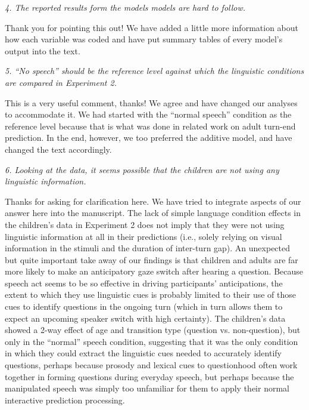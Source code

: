 \documentclass[11pt,a4paper]{letter} %
\begin{document}
\begin{letter}{}
\smallskip

\noindent \textit{4. The reported results form the models models are hard to follow.}

\noindent Thank you for pointing this out! We have added a little more information about how each variable was coded and have put summary tables of every model's output into the text.

\smallskip

\noindent \textit{5. ``No speech'' should be the reference level against which the linguistic conditions are compared in Experiment 2.}

\noindent This is a very useful comment, thanks! We agree and have changed our analyses to accommodate it. We had started with the ``normal speech'' condition as the reference level because that is what was done in related work on adult turn-end prediction. In the end, however, we too preferred the additive model, and have changed the text accordingly.

\noindent \textit{6. Looking at the data, it seems possible that the children are not using any linguistic information.}

\noindent Thanks for asking for clarification here. We have tried to integrate aspects of our answer here into the manuscript. The lack of simple language condition effects in the children's data in Experiment 2 does not imply that they were not using linguistic information at all in their predictions (i.e., solely relying on visual information in the stimuli and the duration of inter-turn gap). An unexpected but quite important take away of our findings is that children and adults are far more likely to make an anticipatory gaze switch after hearing a question. Because speech act seems to be so effective in driving participants' anticipations, the extent to which they use linguistic cues is probably limited to their use of those cues to identify questions in the ongoing turn (which in turn allows them to expect an upcoming speaker switch with high certainty). The children's data showed a 2-way effect of age and transition type (question vs. non-question), but only in the ``normal'' speech condition, suggesting that it was the only condition in which they could extract the linguistic cues needed to accurately identify questions, perhaps because prosody and lexical cues to questionhood often work together in forming questions during everyday speech, but perhaps because the manipulated speech was simply too unfamiliar for them to apply their normal interactive prediction processing.


\end{letter}
\end{document}
